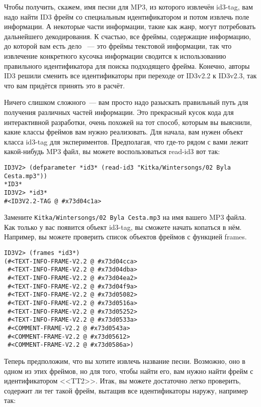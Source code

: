 Чтобы получить, скажем, имя песни для MP3, из которого извлечён id3-tag, вам надо найти
ID3 фрейм со специальным идентификатором и потом извлечь поле информации. А некоторые
части информации, такие как жанр, могут потребовать дальнейшего декодирования. К счастью,
все фреймы, содержащие информацию, до которой вам есть дело ~--- это фреймы текстовой
информации, так что извлечение конкретного кусочка информации сводится к использованию
правильного идентификатора для поиска подходящего фрейма. Конечно, авторы ID3 решили
сменить все идентификаторы при переходе от ID3v2.2 к ID3v2.3, так что вам придётся принять
это в расчёт.

Ничего слишком сложного~--- вам просто надо разыскать правильный путь для получения
различных частей информации. Это прекрасный кусок кода для интерактивной разработки, очень
похожей на тот способ, которым вы выяснили, какие классы фреймов вам нужно
реализовать. Для начала, вам нужен объект класса id3-tag для экспериментов. Предполагая,
что где-то рядом с вами лежит какой-нибудь MP3 файл, вы можете воспользоваться read-id3
вот так:

\begin{lstlisting}
ID3V2> (defparameter *id3* (read-id3 "Kitka/Wintersongs/02 Byla Cesta.mp3"))
*ID3*
ID3V2> *id3*
#<ID3V2.2-TAG @ #x73d04c1a>
\end{lstlisting}

Замените \texttt{Kitka/Wintersongs/02 Byla Cesta.mp3} на имя вашего MP3 файла. Как только
у вас появится объект id3-tag, вы сможете начать копаться в нём. Например, вы можете
проверить список объектов фреймов с функцией frames.

\begin{lstlisting}
ID3V2> (frames *id3*)
(#<TEXT-INFO-FRAME-V2.2 @ #x73d04cca>
 #<TEXT-INFO-FRAME-V2.2 @ #x73d04dba>
 #<TEXT-INFO-FRAME-V2.2 @ #x73d04ea2>
 #<TEXT-INFO-FRAME-V2.2 @ #x73d04f9a>
 #<TEXT-INFO-FRAME-V2.2 @ #x73d05082>
 #<TEXT-INFO-FRAME-V2.2 @ #x73d0516a>
 #<TEXT-INFO-FRAME-V2.2 @ #x73d05252>
 #<TEXT-INFO-FRAME-V2.2 @ #x73d0533a>
 #<COMMENT-FRAME-V2.2 @ #x73d0543a>
 #<COMMENT-FRAME-V2.2 @ #x73d05612>
 #<COMMENT-FRAME-V2.2 @ #x73d0586a>)
\end{lstlisting}

Теперь предположим, что вы хотите извлечь название песни. Возможно, оно в одном из этих
фреймов, но для того, чтобы найти его, вам нужно найти фрейм с идентификатором
<<TT2>>. Итак, вы можете достаточно легко проверить, содержит ли тег такой фрейм, вытащив
все идентификаторы наружу, например так:

